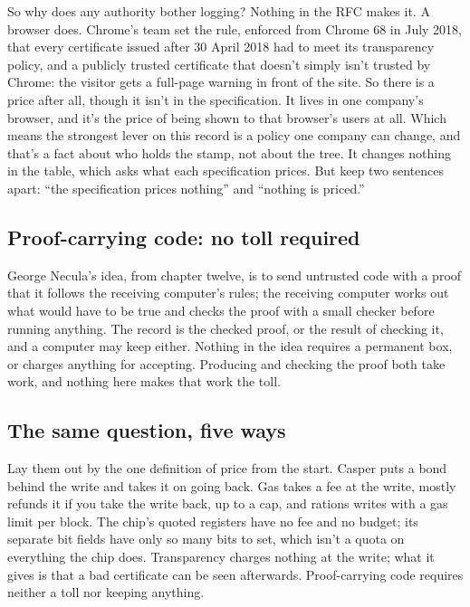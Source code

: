 \documentclass[11pt,twoside]{article}
\theoremstyle{thielethm}
\theoremstyle{thieledef}
\theoremstyle{thieledef}
\theoremstyle{thieledef}
\theoremstyle{thielethm}
\theoremstyle{thieleobs}
\theoremstyle{thielethm}
\begin{document}
So why does any authority bother logging? Nothing in the RFC makes it. A browser does. Chrome's team set the rule, enforced from Chrome 68 in July 2018, that every certificate issued after 30 April 2018 had to meet its transparency policy, and a publicly trusted certificate that doesn't simply isn't trusted by Chrome: the visitor gets a full-page warning in front of the site. So there is a price after all, though it isn't in the specification. It lives in one company's browser, and it's the price of being shown to that browser's users at all. Which means the strongest lever on this record is a policy one company can change, and that's a fact about who holds the stamp, not about the tree. It changes nothing in the table, which asks what each specification prices. But keep two sentences apart: ``the specification prices nothing'' and ``nothing is priced.''

\subsection{Proof-carrying code: no toll required}

George Necula's idea, from chapter twelve, is to send untrusted code with a proof that it follows the receiving computer's rules; the receiving computer works out what would have to be true and checks the proof with a small checker before running anything. The record is the checked proof, or the result of checking it, and a computer may keep either. Nothing in the idea requires a permanent box, or charges anything for accepting. Producing and checking the proof both take work, and nothing here makes that work the toll.

\subsection{The same question, five ways}

Lay them out by the one definition of price from the start. Casper puts a bond behind the write and takes it on going back. Gas takes a fee at the write, mostly refunds it if you take the write back, up to a cap, and rations writes with a gas limit per block. The chip's quoted registers have no fee and no budget; its separate bit fields have only so many bits to set, which isn't a quota on everything the chip does. Transparency charges nothing at the write; what it gives is that a bad certificate can be seen afterwards. Proof-carrying code requires neither a toll nor keeping anything.
\end{document}
